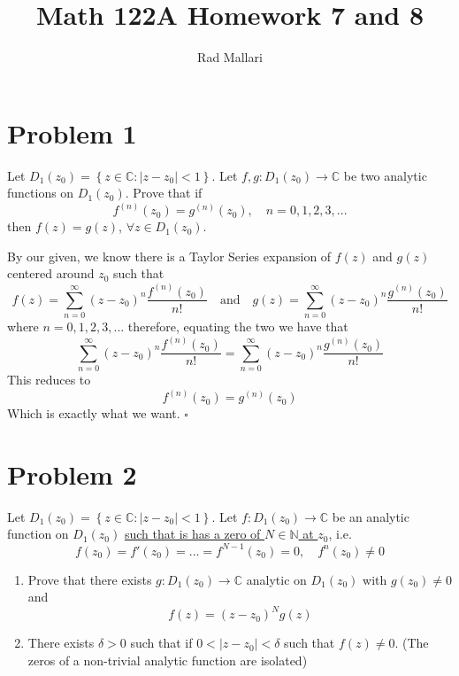 \documentclass[12pt]{article}
\title{Math 122A Homework 7 and 8}
\author{Rad Mallari}
\newcommand{\N}{\mathbb{N}}
\newcommand{\C}{\mathbb{C}}
\newcommand{\set}[1]{\left\{ #1\right\}}
\newenvironment{proof}{\noindent{\bf Proof.}}{\hfill $\square$\medskip}
\begin{document}
\maketitle


\section{Problem 1}
Let $D_{1}(z_{0})=\set{z\in\C:|z-z_{0}|<1}$. Let $f,g:D_{1}(z_{0})\to\C$ be two analytic functions on $D_{1}(z_{0})$. Prove that if
$$f^{(n)}(z_{0})=g^{(n)}(z_{0}),\quad n=0,1,2,3,...$$
then $f(z)=g(z)$, $\forall z\in D_{1}(z_{0})$.

\begin{proof}
By our given, we know there is a Taylor Series expansion of $f(z)$ and $g(z)$ centered around $z_{0}$ such that
$$f(z)=\sum_{n=0}^{\infty}(z-z_{0})^{n}\frac{f^{(n)}(z_{0})}{n!} \quad\text{and}\quad g(z)=\sum_{n=0}^{\infty}(z-z_{0})^{n}\frac{g^{(n)}(z_{0})}{n!}$$
where $n=0,1,2,3,...$ therefore, equating the two we have that
$$\sum_{n=0}^{\infty}(z-z_{0})^{n}\frac{f^{(n)}(z_{0})}{n!}=\sum_{n=0}^{\infty}(z-z_{0})^{n}\frac{g^{(n)}(z_{0})}{n!}$$
This reduces to
$$f^{(n)}(z_{0})=g^{(n)}(z_{0})$$
Which is exactly what we want.
\end{proof}


\newpage
\section{Problem 2}
Let $D_{1}(z_{0})=\set{z\in\C:|z-z_{0}|<1}$. Let $f:D_{1}(z_{0})\to\C$ be an analytic function on $D_{1}(z_{0})$ \underline{such that is has a zero of $N\in\N$ at $z_{0}$}, i.e.
$$f(z_{0})=f'(z_{0})=...=f^{N-1}(z_{0})=0,\quad f^{n}(z_{0})\neq0$$
\begin{enumerate}[label=\textbf{(\roman*)}]
    \item Prove that there exists $g:D_{1}(z_{0})\to\C$ analytic on $D_{1}(z_{0})$ with $g(z_{0})\neq0$ and
          $$f(z)=(z-z_{0})^{N}g(z)$$
    \item There exists $\delta>0$ such that if $0<|z-z_{0}|<\delta$ such that $f(z)\neq0$. (The zeros of a non-trivial analytic function are isolated)
\end{enumerate}
\end{document}
